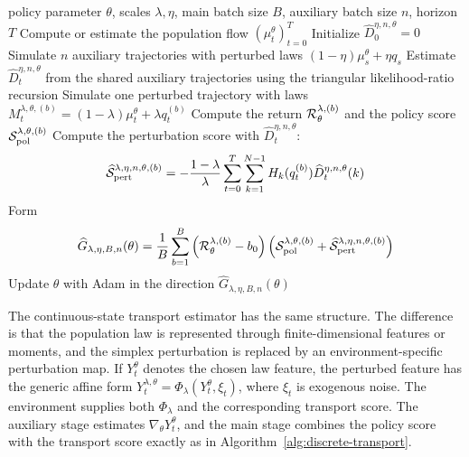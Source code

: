 \begin{algorithm}[H]
\caption{Discrete fixed-scale transport policy gradient}
\label{alg:discrete-transport}
\begin{algorithmic}[1]
\Require policy parameter $\theta$, scales $\lambda,\eta$, main batch size $B$, auxiliary batch size $n$, horizon $T$
\State Compute or estimate the population flow $(\mu_t^\theta)_{t=0}^T$
\State Initialize $\widehat D_0^{\eta,n,\theta}=0$
\State Simulate $n$ auxiliary trajectories with perturbed laws $(1-\eta)\mu_s^\theta+\eta q_s$
    \State Estimate $\widehat D_t^{\eta,n,\theta}$ from the shared auxiliary trajectories using the triangular likelihood-ratio recursion
\EndFor
{}
    \State Simulate one perturbed trajectory with laws $M_t^{\lambda,\theta,(b)}=(1-\lambda)\mu_t^\theta+\lambda q_t^{(b)}$
    \State Compute the return ${\cal R}_\theta^{\lambda,(b)}$ and the policy score ${\cal S}_\mathrm{pol}^{\lambda,\theta,(b)}$
    \State Compute the perturbation score with $\widehat D_t^{\eta,n,\theta}$:
    \begin{align}
        \widehat {{\cal S}}_\mathrm{pert}^{\lambda,\eta,n,\theta,(b)}
        =
        -\frac{1-\lambda}{\lambda}
        \sum_{t=0}^T
        \sum_{k=1}^{N-1}
        H_k(q_t^{(b)})
        \widehat D_t^{\eta,n,\theta}(k)
    \end{align}
\EndFor
\State Form
\begin{align}
    \widehat G_{\lambda,\eta,B,n}(\theta)
    =
    \frac1B
    \sum_{b=1}^B
    \left(
        {\cal R}_\theta^{\lambda,(b)}-b_0
    \right)
    \left(
        {\cal S}_\mathrm{pol}^{\lambda,\theta,(b)}
        +
        \widehat {{\cal S}}_\mathrm{pert}^{\lambda,\eta,n,\theta,(b)}
    \right)
\end{align}
\State Update $\theta$ with Adam in the direction $\widehat G_{\lambda,\eta,B,n}(\theta)$
\end{algorithmic}
\end{algorithm}

The continuous-state transport estimator has the same structure. The difference is that the population law is represented through finite-dimensional features or moments, and the simplex perturbation is replaced by an environment-specific perturbation map. If $Y_t^\theta$ denotes the chosen law feature, the perturbed feature has the generic affine form $Y_t^{\lambda,\theta} = \Phi_\lambda(Y_t^\theta,\xi_t)$,
where $\xi_t$ is exogenous noise. The environment supplies both $\Phi_\lambda$ and the corresponding transport score. The auxiliary stage estimates $\nabla_\theta Y_t^\theta$, and the main stage combines the policy score with the transport score exactly as in Algorithm~\ref{alg:discrete-transport}.

